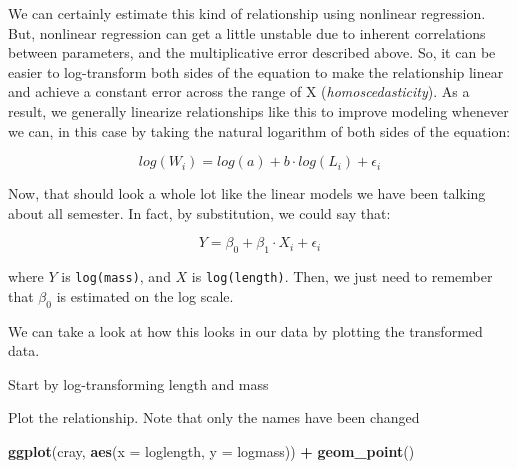 \documentclass[
]{book}
\newenvironment{Shaded}{\begin{snugshade}}{\end{snugshade}}
\newcommand{\CommentTok}[1]{\textcolor[rgb]{0.56,0.35,0.01}{\textit{#1}}}
\newcommand{\DataTypeTok}[1]{\textcolor[rgb]{0.13,0.29,0.53}{#1}}
\newcommand{\KeywordTok}[1]{\textcolor[rgb]{0.13,0.29,0.53}{\textbf{#1}}}
\newcommand{\NormalTok}[1]{#1}
\newcommand{\OperatorTok}[1]{\textcolor[rgb]{0.81,0.36,0.00}{\textbf{#1}}}
\newcommand{\StringTok}[1]{\textcolor[rgb]{0.31,0.60,0.02}{#1}}
\begin{document}
We can certainly estimate this kind of relationship using nonlinear regression. But, nonlinear regression can get a little unstable due to inherent correlations between parameters, and the multiplicative error described above. So, it can be easier to log-transform both sides of the equation to make the relationship linear and achieve a constant error across the range of X (\emph{homoscedasticity}). As a result, we generally linearize relationships like this to improve modeling whenever we can, in this case by taking the natural logarithm of both sides of the equation:

\[log(W_i) = log(a) + b \cdot log(L_i) + \epsilon_i\]

Now, that should look a whole lot like the linear models we have been talking about all semester. In fact, by substitution, we could say that:

\[Y = \beta_0 + \beta_1 \cdot X_i + \epsilon_i\]

where \(Y\) is \texttt{log(mass)}, and \(X\) is \texttt{log(length)}. Then, we just need to remember that \(\beta_0\) is estimated on the log scale.

We can take a look at how this looks in our data by plotting the transformed data.

Start by log-transforming length and mass

\begin{Shaded}
\end{Shaded}

Plot the relationship. Note that only the names have been changed

\begin{Shaded}
\begin{Highlighting}[]
\KeywordTok{ggplot}\NormalTok{(cray, }\KeywordTok{aes}\NormalTok{(}\DataTypeTok{x =}\NormalTok{ loglength, }\DataTypeTok{y =}\NormalTok{ logmass)) }\OperatorTok{+}
\StringTok{  }\KeywordTok{geom_point}\NormalTok{()}
\end{Highlighting}
\end{Shaded}
\end{document}
